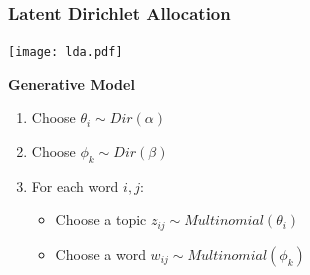 \documentclass[t]{beamer}
\begin{document}
\begin{frame}
\frametitle{Latent Dirichlet Allocation}

\texttt{[image: lda.pdf]}
\bigskip

\textbf{Generative Model}
\begin{enumerate}
\item Choose $\theta_i \sim Dir(\alpha)$
\pause
\item Choose $\phi_k \sim Dir(\beta)$
\pause
\item For each word $i, j$:
    \begin{itemize}
    \item Choose a topic $z_{ij} \sim Multinomial(\theta_i)$
    \item Choose a word $w_{ij} \sim Multinomial(\phi_k)$
    \end{itemize}
\end{enumerate}

\cite{Blei2003}
\end{frame}
\end{document}
